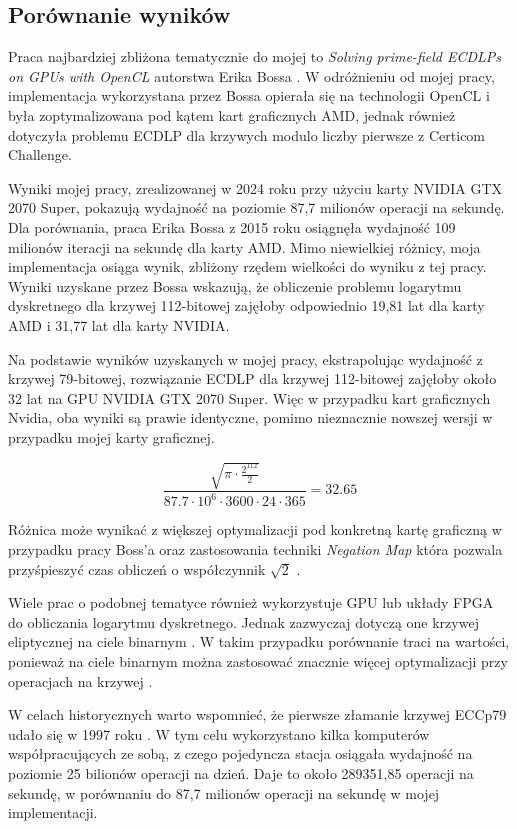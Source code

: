 \subsection{Porównanie wyników}
Praca najbardziej zbliżona tematycznie do mojej to \textit{Solving prime-field 
ECDLPs on GPUs with OpenCL} autorstwa Erika Bossa \cite{Boss2015}. W odróżnieniu 
od mojej pracy, implementacja wykorzystana przez Bossa opierała się na technologii 
OpenCL i była zoptymalizowana pod kątem kart graficznych AMD, jednak również 
dotyczyła problemu ECDLP dla krzywych modulo liczby pierwsze z Certicom Challenge.

Wyniki mojej pracy, zrealizowanej w 2024 roku przy użyciu karty NVIDIA GTX 2070 
Super, pokazują wydajność na poziomie 87,7 milionów operacji na sekundę. Dla 
porównania, praca Erika Bossa z 2015 roku osiągnęła wydajność 109 milionów iteracji 
na sekundę dla karty AMD.
Mimo niewielkiej różnicy, moja implementacja osiąga wynik, zbliżony rzędem wielkości do
wyniku z tej pracy.
Wyniki uzyskane przez Bossa wskazują, że obliczenie 
problemu logarytmu dyskretnego dla krzywej 112-bitowej zajęłoby odpowiednio 19,81 
lat dla karty AMD i 31,77 lat dla karty NVIDIA.

Na podstawie wyników uzyskanych w mojej pracy, ekstrapolując wydajność z krzywej 
79-bitowej, rozwiązanie ECDLP dla krzywej 112-bitowej zajęłoby około 32 lat na GPU 
NVIDIA GTX 2070 Super. Więc w przypadku kart graficznych Nvidia, oba wyniki są prawie identyczne,
pomimo nieznacznie nowszej wersji w przypadku mojej karty graficznej.

$$
\frac{\sqrt{\pi \cdot \frac{2^{112}}{2}}}{87.7 \cdot 10^{6} \cdot 3600 \cdot 24 \cdot 365} = 32.65
$$

Różnica może wynikać z większej optymalizacji pod konkretną kartę graficzną
w przypadku pracy Boss'a oraz zastosowania techniki \textit{Negation Map} która pozwala przyśpieszyć czas obliczeń
o współczynnik $\sqrt{2}$ \cite{Negation}.

Wiele prac o podobnej tematyce również wykorzystuje GPU lub układy FPGA do
obliczania logarytmu dyskretnego. Jednak zazwyczaj dotyczą one krzywej
eliptycznej na ciele binarnym \cite{Wenger2014,FPGA2008,Majkowski2008}. W
takim przypadku porównanie traci na wartości, ponieważ na ciele binarnym
można zastosować znacznie więcej optymalizacji przy operacjach na krzywej \cite{Blake2005}.

W celach historycznych warto wspomnieć, że pierwsze złamanie krzywej ECCp79
udało się w 1997 roku \cite{certicom-cracked}. W tym celu wykorzystano kilka komputerów
współpracujących ze sobą, z czego pojedyncza stacja osiągała wydajność na
poziomie 25 bilionów operacji na dzień. Daje to około 289351,85 operacji na
sekundę, w porównaniu do 87,7 milionów operacji na sekundę w mojej
implementacji.